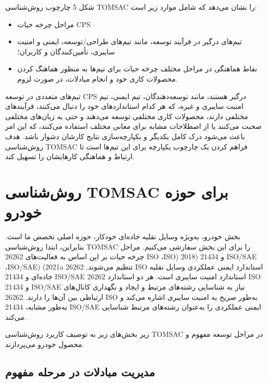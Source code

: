 \documentclass[a4paper,10pt]{article}
\begin{document}
        شکل 5 چارچوب روش‌شناسی TOMSAC را نشان می‌دهد که شامل موارد زیر است:
    
        \begin{itemize}
            
            \item مراحل چرخه حیات CPS

            \item تیم‌های درگیر در فرآیند توسعه، مانند تیم‌های طراحی/توسعه، ایمنی و امنیت   سایبری، تأمین‌کنندگان و کاربران؛

            \item نقاط هماهنگی در مراحل مختلف چرخه حیات برای تیم‌ها به منظور هماهنگ کردن محصولات کاری خود و انجام مبادلات، در صورت لزوم.

        \end{itemize}

        تیم‌های متعددی در توسعه CPS درگیر هستند، مانند توسعه‌دهندگان، تیم ایمنی، تیم امنیت سایبری و غیره، که هر کدام استانداردهای خود را دنبال می‌کنند، فرآیندهای مختلفی دارند، محصولات کاری مختلفی توسعه می‌دهند و حتی به زبان‌های مختلفی صحبت می‌کنند یا از اصطلاحات مشابه برای معانی مختلف استفاده می‌کنند، که این امر باعث می‌شود درک کامل یکدیگر و یکپارچه‌سازی نتایج کارشان دشوار باشد. هدف روش‌شناسی TOMSAC فراهم کردن یک چارچوب یکپارچه برای این تیم‌ها است تا ارتباط و هماهنگی کارهایشان را تسهیل کند.

    \section{روش‌شناسی TOMSAC برای حوزه خودرو}

        بخش خودرو، به‌ویژه وسایل نقلیه جاده‌ای خودکار، حوزه اصلی تخصص ما است. بنابراین، ابتدا روش‌شناسی TOMSAC را برای این بخش سفارشی می‌کنیم. مراحل چرخه حیات بر این اساس به فعالیت‌های 26262 ISO ،ISO) 2018) و 21434 ISO/SAE ،ISO/SAE) (2021a تنظیم می‌شوند. 26262 ISO استاندارد ایمنی عملکردی وسایل نقلیه جاده‌ای و 21434 ISO/SAE استاندارد امنیت سایبری است. هر دو استاندارد 26262 ISO و 21434 ISO/SAE نیاز به شناسایی رشته‌های مرتبط و ایجاد و نگهداری کانال‌های ارتباطی بین آن‌ها را دارند. 26262 ISO به‌طور صریح به امنیت سایبری اشاره می‌کند و به‌طور مشابه، 21434 ISO/SAE ایمنی عملکردی را به‌عنوان رشته‌های مرتبط شناسایی می‌کند.

        زیر بخش‌های زیر به توصیف کاربرد روش‌شناسی TOMSAC در مراحل توسعه مفهوم و محصول خودرو می‌پردازند.

        \subsection{مدیریت مبادلات در مرحله مفهوم}
\end{document}
